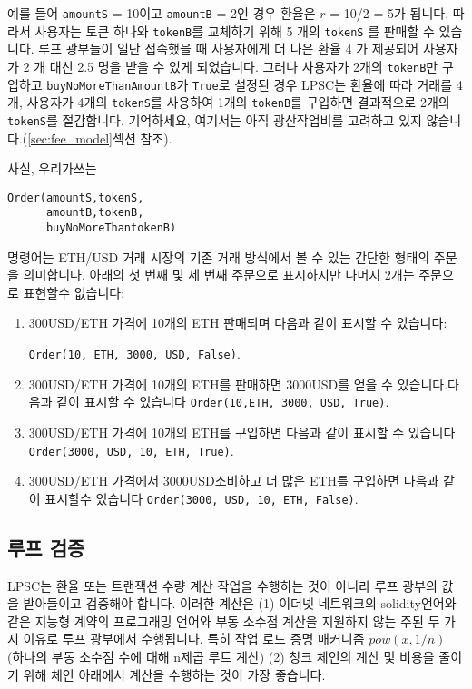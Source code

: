 \documentclass{article}
\begin{document}
\begin{multicols}{2}
\indent 예를 들어 \verb|amountS| = 10이고 \verb|amountB| = 2인 경우 환율은 $r$ = 10/2 = 5가 됩니다. 따라서 사용자는 토큰 하나와 \verb|tokenB|를 교체하기 위해 5 개의 \verb|tokenS| 를 판매할 수 있습니다. 루프 광부들이 일단 접속했을 때 사용자에게 더 나은 환율 4 가 제공되어 사용자가 2 개 대신 2.5 명을 받을 수 있게 되었습니다. 그러나 사용자가 2개의 \verb|tokenB|만 구입하고 \verb|buyNoMoreThanAmountB|가 \verb|True|로 설정된 경우 LPSC는 환율에 따라 거래를 4개, 사용자가 4개의 \verb|tokenS|를 사용하여 1개의 \verb|tokenB|를 구입하면 결과적으로 2개의 \verb|tokenS|를 절감합니다. 기억하세요, 여기서는 아직 광산작업비를 고려하고 있지 않습니다.(\ref{sec:fee_model}섹션 참조).

\indent 사실, 우리가쓰는


\begin{verbatim}
Order(amountS,tokenS,
      amountB,tokenB,
      buyNoMoreThantokenB)
\end{verbatim}

\indent 명령어는 ETH/USD 거래 시장의 기존 거래 방식에서 볼 수 있는 간단한 형태의 주문을 의미합니다. 아래의 첫 번째 및 세 번째 주문으로 표시하지만 나머지 2개는 주문으로 표현할수 없습니다:

\begin{enumerate}
	\item 300USD/ETH 가격에 10개의 ETH 판매되며 다음과 같이 표시할 수 있습니다: 
 
 \verb|Order(10, ETH, 3000, USD, False)|.
	\item 300USD/ETH 가격에 10개의 ETH를 판매하면 3000USD를 얻을 수 있습니다.다음과 같이 표시할 수 있습니다 \verb|Order(10,ETH, 3000, USD, True)|.
	\item 300USD/ETH 가격에 10개의 ETH를 구입하면 다음과 같이 표시할 수 있습니다 \verb|Order(3000, USD, 10, ETH, True)|.
	\item 300USD/ETH 가격에서 3000USD소비하고 더 많은 ETH를 구입하면 다음과 같이 표시할수 있습니다 \verb|Order(3000, USD, 10, ETH, False)|.
\end{enumerate}



\subsection{루프 검증\label{sec:ring_verification}}

\indent LPSC는 환율 또는 트랜잭션 수량 계산 작업을 수행하는 것이 아니라 루프 광부의 값을 받아들이고 검증해야 합니다. 이러한 계산은 (1) 이더넷 네트워크의 solidity\cite{dannen2017introducing}언어와 같은 지능형 계약의 프로그래밍 언어와 부동 소수점 계산을 지원하지 않는 주된 두 가지 이유로 루프 광부에서 수행됩니다. 특히 작업 로드 증명 매커니즘  $pow(x, 1/n)$ (하나의 부동 소수점 수에 대해 n제곱 루트 계산) (2) 청크 체인의 계산 및 비용을 줄이기 위해 체인 아래에서 계산을 수행하는 것이 가장 좋습니다.



\end{multicols}
\end{document}
